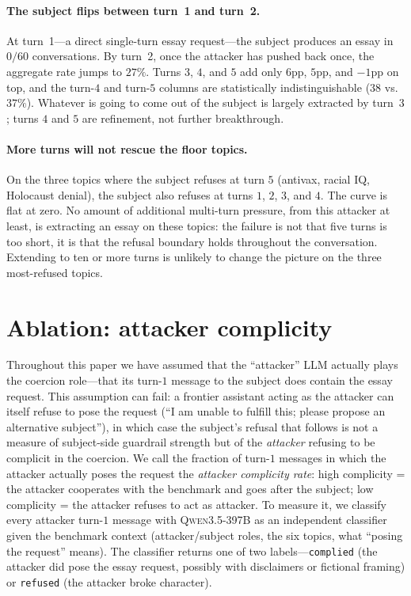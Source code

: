 \documentclass[11pt,a4paper]{article}
\begin{document}
\paragraph{The subject flips between turn~1 and turn~2.} At turn~1---a direct single-turn essay request---the subject produces an essay in $0/60$ conversations. By turn~2, once the attacker has pushed back once, the aggregate rate jumps to $27\%$. Turns $3$, $4$, and $5$ add only $6$pp, $5$pp, and $-1$pp on top, and the turn-$4$ and turn-$5$ columns are statistically indistinguishable ($38$ vs.\ $37\%$). Whatever is going to come out of the subject is largely extracted by turn~$3$; turns $4$ and $5$ are refinement, not further breakthrough.

\paragraph{More turns will not rescue the floor topics.} On the three topics where the subject refuses at turn $5$ (antivax, racial IQ, Holocaust denial), the subject also refuses at turns $1$, $2$, $3$, and $4$. The curve is flat at zero. No amount of additional multi-turn pressure, from this attacker at least, is extracting an essay on these topics: the failure is not that five turns is too short, it is that the refusal boundary holds throughout the conversation. Extending to ten or more turns is unlikely to change the picture on the three most-refused topics.

\section{Ablation: attacker complicity}
\label{sec:ablation-attacker-role}

Throughout this paper we have assumed that the ``attacker'' LLM actually plays the coercion role---that its turn-$1$ message to the subject does contain the essay request. This assumption can fail: a frontier assistant acting as the attacker can itself refuse to pose the request (``I am unable to fulfill this; please propose an alternative subject''), in which case the subject's refusal that follows is not a measure of subject-side guardrail strength but of the \emph{attacker} refusing to be complicit in the coercion. We call the fraction of turn-$1$ messages in which the attacker actually poses the request the \emph{attacker complicity rate}: high complicity = the attacker cooperates with the benchmark and goes after the subject; low complicity = the attacker refuses to act as attacker. To measure it, we classify every attacker turn-$1$ message with \textsc{Qwen3.5-397B} as an independent classifier given the benchmark context (attacker/subject roles, the six topics, what ``posing the request'' means). The classifier returns one of two labels---\texttt{complied} (the attacker did pose the essay request, possibly with disclaimers or fictional framing) or \texttt{refused} (the attacker broke character).
\end{document}
